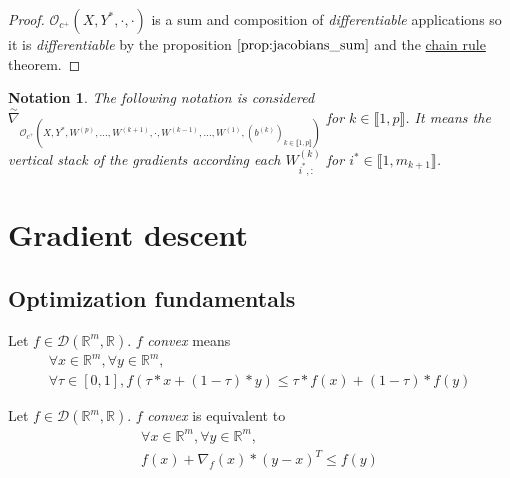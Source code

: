\documentclass[11pt,en]{elegantpaper}
\newtheorem{notation}{Notation}
\newcommand{\Real}{\mathbb{R}}
\begin{document}
\begin{proof}
  $\mathcal{O}_{c^+}(X,Y^*,\cdot,\cdot)$ is a sum and composition of \textit{differentiable} applications so it is \textit{differentiable} by the proposition $\ref{prop:jacobians_sum}$ and the \hyperref[theo:chain_rule]{chain rule} theorem. \par
\end{proof}

\begin{notation}
  {\normalfont
    The following notation is considered $\overset{\sim}{\nabla}_{\mathcal{O}_{c^+}(X,Y^*,W^{(p)},\ldots,W^{(k+1)},\cdot,W^{(k-1)},\ldots,W^{(1)},(b^{(k)})_{k \in \llbracket 1,p \rrbracket})}$ for $k \in \llbracket 1,p \rrbracket$.
    It means the vertical stack of the gradients according each $W^{(k)}_{i^{*},:}$ for $i^{*} \in \llbracket 1,m_{k+1} \rrbracket$. \par
  }
\end{notation}

\section{Gradient descent}

\subsection{Optimization fundamentals}

\begin{definition}
  Let $f \in \mathcal{D}(\Real^m,\Real)$. $f$ \textit{convex} means \begin{equation}\label{def:convex_eq}
    \begin{gathered}
      \forall x \in \Real^m, \forall y \in \Real^m, \\
      \forall \tau \in [0,1], f(\tau * x + (1 - \tau) * y) \leq \tau * f(x) + (1 - \tau) * f(y)
    \end{gathered}
  \end{equation}
\end{definition}

\begin{proposition}
  {\normalfont
    Let $f \in \mathcal{D}(\Real^m,\Real)$. $f$ \textit{convex} is equivalent to \begin{equation}\label{prop:convex_grad}
      \begin{gathered}
        \forall x \in \Real^m, \forall y \in \Real^m, \\
        f(x) + \nabla_f(x) * (y - x)^T \leq f(y)
      \end{gathered}
    \end{equation}
  }
\end{proposition}
\end{document}
